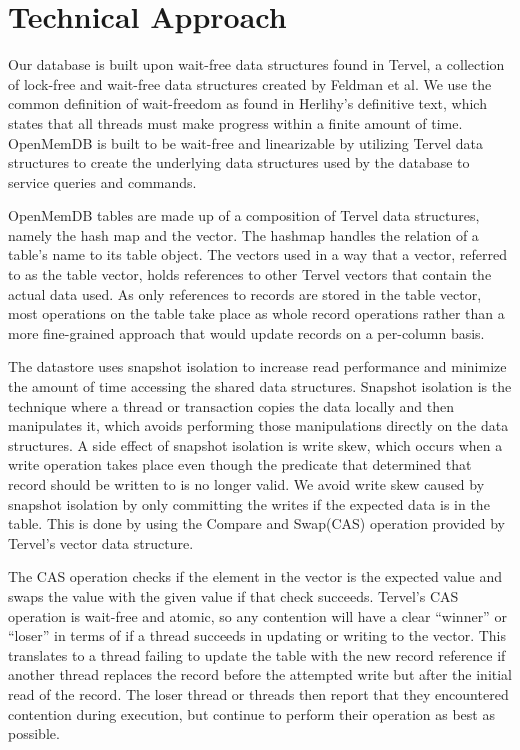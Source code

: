 \documentclass[conference, compsoc]{IEEEtran}
\begin{document}
\section{Technical Approach}
Our database is built upon wait-free data structures found in Tervel, a collection of
lock-free and wait-free data structures created by Feldman et al\cite{tervel:hazard_pointer}\cite{tervel:hash_map}\cite{tervel:vector}. 
We use the common definition of wait-freedom as found in Herlihy's definitive text, which
states that all threads must make progress within a finite amount of time\cite{herlihy:waitfree}. OpenMemDB is 
built to be wait-free and linearizable by utilizing Tervel data structures to create the 
underlying data structures used by the database to service queries and commands.
\par\vspace{\baselineskip}
OpenMemDB tables are made up of a composition of Tervel data structures, namely the hash map and the
vector. The hashmap handles the relation of a table's name to its table object. The vectors used in a
way that a vector, referred to as the table vector, holds references to other Tervel vectors that contain
the actual data used. As only references to records are stored in the table vector, most operations on the
table take place as whole record operations rather than a more fine-grained approach that would update
records on a per-column basis.
\par\vspace{\baselineskip}
The datastore uses snapshot isolation to increase read performance and minimize the amount of time accessing
the shared data structures. Snapshot isolation is the technique where a thread or transaction copies the data
locally and then manipulates it, which avoids performing those manipulations directly on the data structures.
A side effect of snapshot isolation is write skew, which occurs when a write operation takes place even though the
predicate that determined that record should be written to is no longer valid.
We avoid write skew caused by snapshot isolation by only committing the writes
if the expected data is in the table. This is done by using the Compare and Swap(CAS) operation provided
by Tervel's vector data structure. 
\par\vspace{\baselineskip}
The CAS operation checks if the element in the vector is the
expected value and swaps the value with the given value if that check succeeds. Tervel's CAS
operation is wait-free and atomic, so any contention will have a clear ``winner'' or ``loser'' in terms
of if a thread succeeds in updating or writing to the vector. This translates to a thread failing to update the
table with the new record reference if another thread replaces the record before the attempted write but 
after the initial read of the record.  The loser thread or threads then report that they encountered 
contention during execution, but continue to perform their operation as best as possible.
\end{document}
